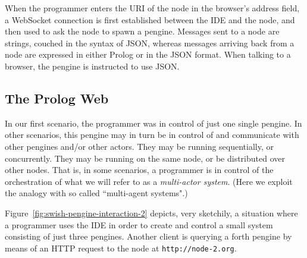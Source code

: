\documentclass{tlp}
\begin{document}
When the programmer enters the URI of the node in the browser's address field, a WebSocket connection is first established between the IDE and the node, and then used to ask the node to spawn a pengine. Messages sent to a node are strings, couched in the syntax of JSON, whereas messages arriving back from a node are expressed in either Prolog or in the JSON format. When talking to a browser, the pengine is instructed to use JSON.


\subsection{The Prolog Web}

\noindent In our first scenario, the programmer was in control of just one single pengine. In other scenarios, this pengine may in turn be in control of and communicate with other pengines and/or other actors. They may be running sequentially, or concurrently. They may be running on the same node, or be distributed over other nodes. That is, in some scenarios, a programmer is in control of the orchestration of what we will refer to as a \textit{multi-actor system}. (Here we exploit the analogy with so called ``multi-agent systems".)

Figure~\ref{fig:swish-pengine-interaction-2} depicts, very sketchily, a situation where a programmer uses the IDE in order to create and control a small system consisting of just three pengines. Another client is querying a forth pengine by means of an HTTP request to the node at \texttt{http://node-2.org}.

\end{document}
